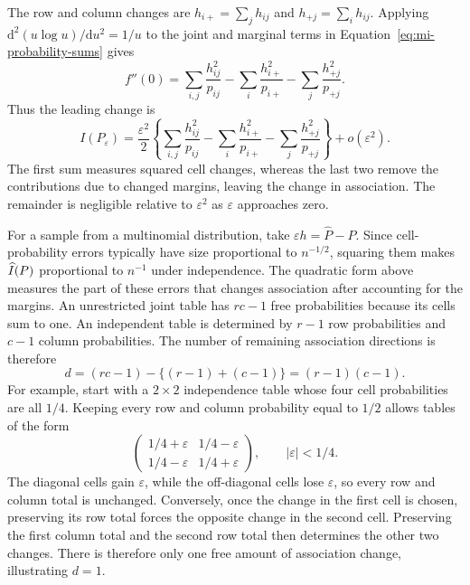 The row and column changes are \(h_{i+}=\sum_jh_{ij}\) and
\(h_{+j}=\sum_ih_{ij}\). Applying
\(\mathrm d^2(u\log u)/\mathrm du^2=1/u\) to the joint and marginal
terms in Equation~\eqref{eq:mi-probability-sums} gives
\begin{equation}
 f''(0)=\sum_{i,j}\frac{h_{ij}^2}{p_{ij}}
        -\sum_i\frac{h_{i+}^2}{p_{i+}}
        -\sum_j\frac{h_{+j}^2}{p_{+j}}.
\end{equation}
Thus the leading change is
\begin{equation}
 I(P_\varepsilon)
 =\frac{\varepsilon^2}{2}
  \left\{\sum_{i,j}\frac{h_{ij}^2}{p_{ij}}
        -\sum_i\frac{h_{i+}^2}{p_{i+}}
        -\sum_j\frac{h_{+j}^2}{p_{+j}}\right\}
  +o(\varepsilon^2).
 \label{eq:appendix-mi-second-order}
\end{equation}
The first sum measures squared cell changes, whereas the last two remove the
contributions due to changed margins, leaving the change in association.
The remainder is negligible relative to \(\varepsilon^2\) as
\(\varepsilon\) approaches zero.

For a sample from a multinomial distribution, take \(\varepsilon h=\widehat P-P\).
Since cell-probability errors typically have size proportional to \(n^{-1/2}\),
squaring them makes \(\widehat I(P)\) proportional to \(n^{-1}\) under
independence. The quadratic form above measures the part of these errors
that changes association after accounting for the margins. An unrestricted
joint table has \(rc-1\) free probabilities because its cells sum to one.
An independent table is determined by \(r-1\) row probabilities and
\(c-1\) column probabilities. The number of remaining association
directions is therefore
\begin{equation}
 d=(rc-1)-\{(r-1)+(c-1)\}=(r-1)(c-1).
 \label{eq:independence-association-dimension}
\end{equation}
For example, start with a \(2\times2\) independence table whose four cell
probabilities are all \(1/4\). Keeping every row and column probability
equal to \(1/2\) allows tables of the form
\begin{equation*}
 \begin{pmatrix}
  1/4+\varepsilon&1/4-\varepsilon\\
  1/4-\varepsilon&1/4+\varepsilon
 \end{pmatrix},
 \qquad |\varepsilon|<1/4.
\end{equation*}
The diagonal cells gain \(\varepsilon\), while the off-diagonal cells
lose \(\varepsilon\), so every row and column total is unchanged.
Conversely, once the change in the first cell is chosen, preserving its
row total forces the opposite change in the second cell. Preserving the
first column total and the second row total then determines the other
two changes. There is therefore only one free amount of association
change, illustrating \(d=1\).

